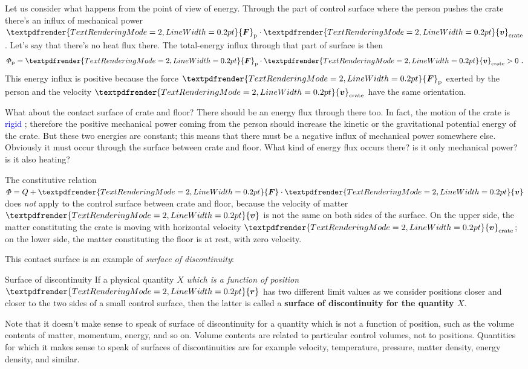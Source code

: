 \documentclass[a4paper,12pt,%
onecolumn,oneside,%
british%
]{memoir}
\renewcommand*{\bm}[1]{\textpdfrender{TextRenderingMode=2,LineWidth=0.2pt}{\boldsymbol{#1}}}
\renewcommand*{\|}[1][]{\nonscript\:#1\vert\nonscript\:\mathopen{}}
\newcommand*{\sect}{\S}%
\renewcommand*{\autoref}[3][\sect\,\ref]{\textcolor{blue}{#3}
\raisebox{0.6ex}{\color{blue}\miniscule%
\faIcon{angle-right}%
\;#1{#2}\;p.\,\pageref{#2}}}
\newcommand*{\yr}{\bm{r}}
\newcommand*{\yv}{\bm{v}}
\newcommand*{\yvc}{\yv_{\textrm{crate}}}
\newcommand*{\yH}{\varPhi}%
\newcommand*{\yQ}{Q}%
\newcommand*{\yF}{\bm{F}}
\newcommand*{\yFp}{\yF_{\textrm{p}}}
\begin{document}
Let us consider what happens from the point of view of energy. Through the part of control surface where the person pushes the crate there's an influx of mechanical power $\yFp\cdot\yvc$. Let's say that there's no heat flux there. The total-energy influx through that part of surface is then
\begin{equation*}
  \yH_{\textrm{p}} = \yFp\cdot \yvc > 0 \ .
\end{equation*}
This energy influx is positive because the force $\yFp$ exerted by the person and the velocity $\yvc$ have the same orientation.

What about the contact surface of crate and floor? There should be an energy flux through there too. In fact, the motion of the crate is \autoref{sec:rigid_bodies}{rigid}; therefore the positive mechanical power coming from the person should increase the kinetic or the gravitational potential energy of the crate. But these two energies are constant; this means that there must be a negative influx of mechanical power somewhere else. Obviously it must occur through the surface between crate and floor. What kind of energy flux occurs there? is it only mechanical power? is it also heating?

The constitutive relation $\yH = \yQ + \yF\cdot \yv$ does \emph{not} apply to the control surface between crate and floor, because the velocity of matter $\yv$ is not the same on both sides of the surface. On the upper side, the matter constituting the crate is moving with horizontal velocity $\yvc$; on the lower side, the matter constituting the floor is at rest, with zero velocity.

This contact surface is an example of \emph{surface of discontinuity}:
%
\begin{definition}{Surface of discontinuity}\label{def:surface_discontinuity}
If a physical quantity $X$ \emph{which is a function of position $\yr$} has two different limit values as we consider positions closer and closer to the two sides of a small control surface, then the latter is called a \textbf{surface of discontinuity for the quantity $X$}.
\end{definition}

Note that it doesn't make sense to speak of surface of discontinuity for a quantity which is not a function of position, such as the volume contents of matter, momentum, energy, and so on. Volume contents are related to particular control volumes, not to positions. Quantities for which it makes sense to speak of surfaces of discontinuities are for example velocity, temperature, pressure, matter density, energy density, and similar.
\end{document}
